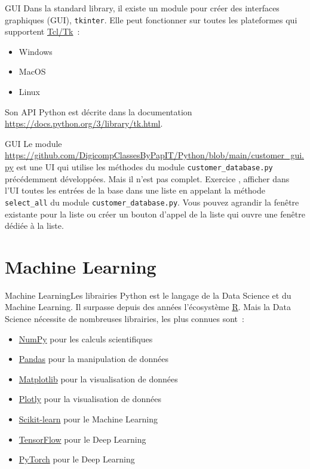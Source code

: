 \documentclass{beamer}
\begin{document}
    \begin{frame}{GUI}
        Dans la standard library, il existe un module pour créer des interfaces graphiques (GUI), \lstinline{tkinter}.
        \bigbreak
        Elle peut fonctionner sur toutes les plateformes qui supportent \href{https://www.tcl.tk/}{Tcl/Tk}~:
        \begin{itemize}
            \item Windows
            \item MacOS
            \item Linux
        \end{itemize}
        Son API Python est décrite dans la documentation \url{https://docs.python.org/3/library/tk.html}.
    \end{frame}

    \begin{frame}{GUI}
        Le module \url{https://github.com/DigicompClassesByPapIT/Python/blob/main/customer_gui.py} est une UI qui utilise les méthodes du module \lstinline{customer_database.py} précédemment développées.
        Mais il n'est pas complet.
        \bigbreak
        Exercice \execcounterdispinc{}, afficher dans l'UI toutes les entrées de la base dans une liste en appelant la méthode \lstinline{select_all} du module \lstinline{customer_database.py}.
        Vous pouvez agrandir la fenêtre existante pour la liste ou créer un bouton d'appel de la liste qui ouvre une fenêtre dédiée à la liste.
    \end{frame}


    \section{Machine Learning}\label{sec:ml}

    \begin{frame}{Machine Learning}{Les librairies}
        Python est le langage de la Data Science et du Machine Learning.
        Il surpasse depuis des années l'écosystème \href{https://posit.co/download/rstudio-desktop/}{R}.
        \bigbreak
        Mais la Data Science nécessite de nombreuses librairies, les plus connues sont~:
        \begin{itemize}
            \item \href{https://numpy.org/}{NumPy} pour les calculs scientifiques
            \item \href{https://pandas.pydata.org/}{Pandas} pour la manipulation de données
            \item \href{https://matplotlib.org/}{Matplotlib} pour la visualisation de données
            \item \href{https://plotly.com/}{Plotly} pour la visualisation de données
            \item \href{https://scikit-learn.org/stable/}{Scikit-learn} pour le Machine Learning
            \item \href{https://www.tensorflow.org/}{TensorFlow} pour le Deep Learning
            \item \href{https://pytorch.org/}{PyTorch} pour le Deep Learning
        \end{itemize}
    \end{frame}
\end{document}
